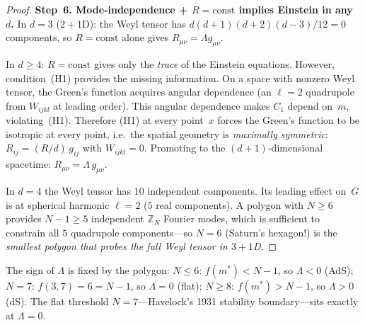\begin{proof}
\medskip
\noindent\textbf{Step~6. Mode-independence + $R = \mathrm{const}$
implies Einstein in any~$d$.}
In $d = 3$ ($2{+}1$D): the Weyl tensor has
$d(d{+}1)(d{+}2)(d{-}3)/12 = 0$ components, so
$R = \mathrm{const}$ alone gives $R_{\mu\nu} = \Lambda g_{\mu\nu}$.

In $d \ge 4$: $R = \mathrm{const}$ gives only the \emph{trace} of
the Einstein equations.
However, condition~(H1) provides the missing information.
On a space with nonzero Weyl tensor, the Green's function acquires
angular dependence (an $\ell = 2$ quadrupole from $W_{ijkl}$
at leading order).
This angular dependence makes $C_1$ depend on~$m$, violating~(H1).
Therefore (H1) at every point~$x$ forces the Green's function
to be isotropic at every point, i.e.\ the spatial geometry is
\emph{maximally symmetric}: $R_{ij} = (R/d)\,g_{ij}$ with $W_{ijkl} = 0$.
Promoting to the $(d{+}1)$-dimensional spacetime:
$R_{\mu\nu} = \Lambda\,g_{\mu\nu}$.

In $d = 4$ the Weyl tensor has $10$ independent components.
Its leading effect on~$G$ is at spherical harmonic $\ell = 2$
($5$ real components).
A polygon with $N \ge 6$ provides $N{-}1 \ge 5$ independent
$\mathbb{Z}_N$ Fourier modes, which is sufficient to constrain
all $5$ quadrupole components---so $N = 6$ (Saturn's hexagon!)
is the \emph{smallest polygon that probes the full Weyl tensor
in $3{+}1$D}.
\end{proof}

\begin{remark}
\label{rmk:lambda-from-N}
The sign of $\Lambda$ is fixed by the polygon:
$N \le 6$: $f(m^*) < N{-}1$, so $\Lambda < 0$ (AdS);
$N = 7$: $f(3,7) = 6 = N{-}1$, so $\Lambda = 0$ (flat);
$N \ge 8$: $f(m^*) > N{-}1$, so $\Lambda > 0$ (dS).
The flat threshold $N = 7$---Havelock's 1931
stability boundary---sits exactly at $\Lambda = 0$.
\end{remark}

